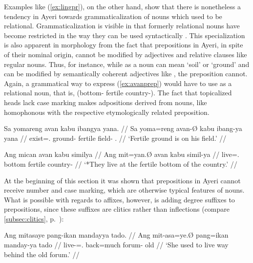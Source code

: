 Examples like (\ref{ex:lingpr}), on the other hand, show that there is
nonetheless a tendency in Ayeri towards grammaticalization of nouns which used
to be relational. Grammaticalization is visible in that formerly relational
nouns have become restricted in the way they can be used syntactically
\citep[174]{lehmann2015}. This specialization is also apparent in morphology
from the fact that prepositions in Ayeri, in spite of their nominal origin,
cannot be modified by adjectives and relative clauses like regular nouns. Thus,
for instance, while  as a noun can mean `soil' or `ground' and
can be modified by semantically coherent adjectives like
, the preposition  cannot. Again, a
grammatical way to express (\ref{ex:avanprep}) would have to use
 as a relational noun, that is, 
(bottom-\Loc{} fertile country-\Gen{}). The fact that topicalized heads lack
case marking makes adpositions derived from nouns, like 
homophonous with the respective etymologically related preposition.

\pex
\a\label{ex:avannn}\begingl
	\gla Sa yomareng avan kabu ibangya yana. //
	\glb Sa yoma=reng avan-Ø kabu ibang-ya yana //
	\glc \PatT{} exist=\TsgI.\AargI{} ground-\Top{} fertile field-\Loc{} 
		\TsgM{}.\Gen{} //
	\glft `Fertile ground is on his field.' //
\endgl

\a\label{ex:avanprep}\ljudge* \begingl
	\gla Ang mican avan kabu similya //
	\glb Ang mit=yan.Ø avan kabu simil-ya //
	\glc \AgtT{} live=\TplM{}.\Top{} bottom fertile country-\Loc{} //
	\glft `*They live at the fertile bottom of the country.' //
\endgl

\xe

At the beginning of this section it was shown that prepositions in Ayeri cannot
receive number and case marking, which are otherwise typical features of nouns.
What is possible with regards to affixes, however, is adding degree suffixes to
prepositions, since these suffixes are clitics rather than inflections 
(compare \autoref{subsec:clitics}, p.~\pageref{clitics_quant}):

\ex\label{ex:prepquant}\begingl
	\gla Ang mitasaye pang-ikan mandayya tado. //
	\glb Ang mit-asa=ye.Ø pang=ikan manday-ya tado //
	\glc \AgtT{} live-\Hab{}=\TsgF{}.\Top{} back=much forum-\Loc{} old //
	\glft `She used to live way behind the old forum.' //
\endgl\xe

